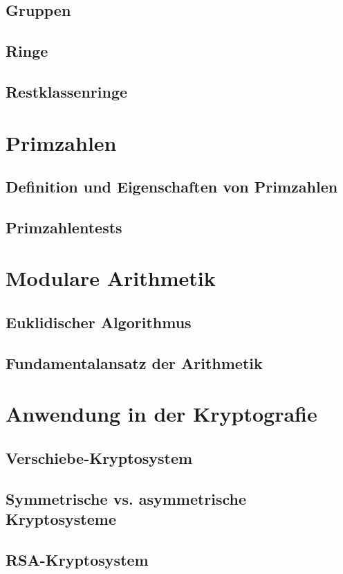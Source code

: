 \documentclass[a4paper,10pt]{article}
\begin{document}
\subsection{Gruppen}
\subsection{Ringe}
\subsection{Restklassenringe}


\section{Primzahlen}
\subsection{Definition und Eigenschaften von Primzahlen}
\subsection{Primzahlentests}


\section{Modulare Arithmetik}
\subsection{Euklidischer Algorithmus}
\subsection{Fundamentalansatz der Arithmetik}



\section{Anwendung in der Kryptografie}
\subsection{Verschiebe-Kryptosystem}
\subsection{Symmetrische vs. asymmetrische Kryptosysteme}
\subsection{RSA-Kryptosystem}
\end{document}
